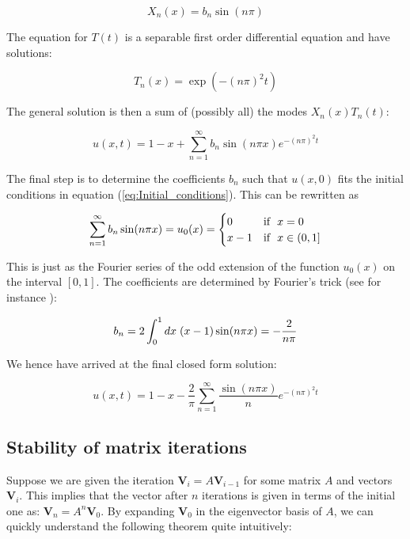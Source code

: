 \documentclass[a4paper, 11pt, notitlepage,english]{article}
\begin{document}
\begin{equation}
X_n(x) = b_n \sin(n\pi)
\label{eq:Separated_X_solution}
\end{equation}

The equation for $T(t)$ is a separable first order differential equation and have solutions:

\begin{equation}
T_n(x) = \exp(-(n\pi)^2t)
\label{eq:Separated_T_solution}
\end{equation}

The general solution is then a sum of (possibly all) the modes $X_n(x)T_n(t)$:

\begin{equation}
u(x,t) = 1-x +\sum_{n=1}^{\infty} b_n \sin(n\pi x) e^{-(n\pi)^2t}
\label{eq:General_solution}
\end{equation}

The final step is to determine the coefficients $b_n$ such that $u(x,0)$ fits the initial conditions in equation (\ref{eq:Initial_conditions}). This can be rewritten as 

\begin{equation}
\sum_{n=1}^{\infty} b_n \sin(n\pi x) = u_0(x) =  \begin{cases} 0 & \mathrm{if} \hspace{2mm} x = 0 \\
x-1 & \mathrm{if} \hspace{2mm} x \in (0,1] \end{cases}
\label{eq:Initial_cond_fit}
\end{equation}

This is just as the Fourier series of the odd extension of the function $u_0(x)$ on the interval $[0,1]$. The coefficients are determined by Fourier's trick (see for instance \cite{Boas}):

\begin{equation}
b_n = 2\int_0^1 dx \hspace{1mm} (x-1) \sin(n\pi x) = -\frac{2}{n\pi}
\label{eq:Fourier_trick}
\end{equation}

We hence have arrived at the final closed form solution:

\begin{equation}
\boxed{u(x,t) = 1-x - \frac{2}{\pi} \sum_{n=1}^{\infty} \frac{\sin(n\pi x)}{n} e^{-(n\pi)^2t}}
\label{eq:Final_solution}
\end{equation}

\subsection{Stability of matrix iterations}
Suppose we are given the iteration $\boldsymbol{V}_i = A \boldsymbol{V}_{i-1}$ for some matrix $A$ and vectors $\boldsymbol{V}_i$. This implies that the vector after $n$ iterations is given in terms of the initial one as: $\boldsymbol{V}_n = A^n \boldsymbol{V}_0$. By expanding $\boldsymbol{V}_0$ in the eigenvector basis of $A$, we can quickly understand the following theorem quite intuitively: \\
\end{document}
